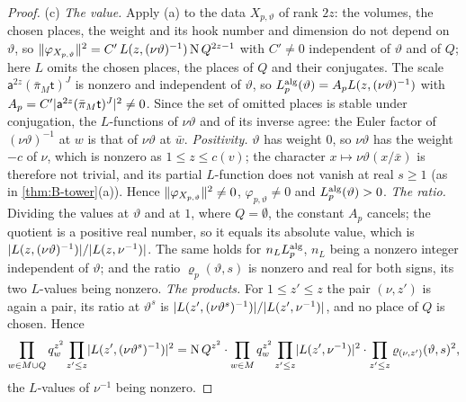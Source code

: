 \begin{proof}
(c) \emph{The value.} Apply (a) to the data $X_{p,\vartheta}$ of rank $2z$: the volumes, the chosen places, the weight and its hook number and dimension do not depend on $\vartheta$, so $\lVert \varphi_{X_{p,\vartheta}}\rVert^2=C'\,L(z,(\nu\vartheta)^{-1})\operatorname{N} Q^{2z-1}$
with $C'\ne0$ independent of $\vartheta$ and of $Q$; here $L$ omits the chosen places, the places of $Q$ and their conjugates. The scale $\mathsf a^{2z}(\bar\pi_M\mathsf t)^J$ is nonzero and independent of $\vartheta$, so
$L^{\rm alg}_p(\vartheta)=A_pL(z,(\nu\vartheta)^{-1})$ with $A_p=C'\lvert \mathsf a^{2z}(\bar\pi_M\mathsf t)^J\rvert^2\ne0$. Since the set of omitted places is stable under conjugation, the $L$-functions of $\nu\vartheta$ and of its inverse agree: the
Euler factor of $(\nu\vartheta)^{-1}$ at $w$ is that of $\nu\vartheta$ at $\bar w$. \emph{Positivity.} $\vartheta$ has weight $0$, so $\nu\vartheta$ has the weight $-c$ of $\nu$, which is nonzero as $1\le z\le c(v)$; the character
$x\mapsto\nu\vartheta(x/\bar x)$ is therefore not trivial, and its partial $L$-function does not vanish at real $s\ge1$ (as in \cref{thm:B-tower}(a)). Hence $\lVert \varphi_{X_{p,\vartheta}}\rVert^2\ne0$, $\varphi_{p,\vartheta}\ne0$ and $L^{\rm alg}_p(\vartheta)>0$. \emph{The ratio.}
Dividing the values at $\vartheta$ and at $1$, where $Q=\emptyset$, the constant $A_p$ cancels; the quotient is a positive real number, so it equals its absolute value, which is
$\lvert L(z,(\nu\vartheta)^{-1})\rvert/\lvert L(z,\nu^{-1})\rvert$. The same holds for $n_LL^{\rm alg}_p$, $n_L$ being a nonzero integer independent of $\vartheta$; and the ratio $\varrho_p(\vartheta,s)$ is nonzero and real for both signs, its two
$L$-values being nonzero. \emph{The products.} For $1\le z'\le z$ the pair $(\nu,z')$ is again a pair, its ratio at $\vartheta^s$ is $\lvert L(z',(\nu\vartheta^s)^{-1})\rvert/\lvert L(z',\nu^{-1})\rvert$, and no place of $Q$ is chosen. Hence
\[
  \prod_{w\in M\cup Q}q_w^{z^2}\prod_{z'\le z}\lvert L(z',(\nu\vartheta^s)^{-1})\rvert^2=\operatorname{N} Q^{z^2}\cdot\prod_{w\in M}q_w^{z^2}\prod_{z'\le z}\lvert L(z',\nu^{-1})\rvert^2\cdot\prod_{z'\le z}\varrho_{(\nu,z')}(\vartheta,s)^2,
\]
the $L$-values of $\nu^{-1}$ being nonzero.


\end{proof}
